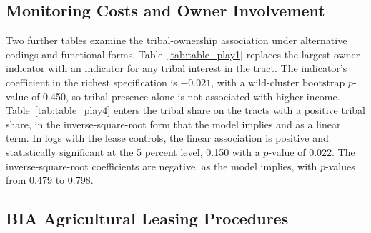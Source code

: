 \documentclass[12pt]{article}
\begin{document}
\subsection*{Monitoring Costs and Owner Involvement}

Two further tables examine the tribal-ownership association under alternative codings and functional forms. Table~\ref{tab:table_play1} replaces the largest-owner indicator with an indicator for any tribal interest in the tract. The indicator's coefficient in the richest specification is $-0.021$, with a wild-cluster bootstrap $p$-value of 0.450, so tribal presence alone is not associated with higher income. Table~\ref{tab:table_play4} enters the tribal share on the tracts with a positive tribal share, in the inverse-square-root form that the model implies and as a linear term. In logs with the lease controls, the linear association is positive and statistically significant at the 5 percent level, 0.150 with a $p$-value of 0.022. The inverse-square-root coefficients are negative, as the model implies, with $p$-values from 0.479 to 0.798.

\clearpage

\subsection*{BIA Agricultural Leasing Procedures}
\end{document}
